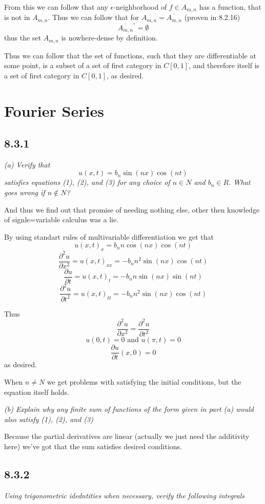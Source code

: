 \documentclass[11pt,oneside,titlepage]{book}
\begin{document}
From this we can follow that any $\epsilon$-neighborhood of $f \in A_{m, n}$ has a
function, that is not in $A_{m, n}$. Thus we can follow that for
$A_{m, n} = \overline{A_{m, n}}$ (proven in 8.2.16)
$$\overline{A_{m, n}}^\circ = \emptyset$$
thus the set $A_{m, n}$ is nowhere-dense by definition.

Thus we can follow that
the set of functions, such that they are differentiable at some point, is a subset
of a set of first category in $C[0, 1]$, and therefore itself is a set of
first category in $C[0, 1]$, as desired.

\section{Fourier Series}

\subsection*{8.3.1}
\textit{(a) Verify that}
$$u(x, t) = b_n \sin(nx) \cos(nt)$$
\textit{satisfies equations (1), (2), and (3) for any choice of $n \in N$ and $b_n \in R$.
  What goes wrong if $n \notin N$?}

And thus we find out that promise of needing nothing else, other then knowledge of
signle=variable calculus was a lie.

By using standart rules of multivariable differentiation we get that
$$u(x, t)_x = b_n n \cos (nx) \cos (nt)$$
$$\frac{\partial^2 u}{\partial x^2} = u(x, t)_{x x} = - b_n n^2 \sin (nx) \cos (nt)$$
$$\frac{\partial u}{\partial t} = u(x, t)_t = - b_n n \sin (nx) \sin (nt)$$
$$\frac{\partial^2 u}{\partial t^2} = u(x, t)_{tt} = - b_n n^2 \sin (nx) \cos (nt)$$

Thus
$$\frac{\partial^2 u}{\partial x^2} = \frac{\partial^2 u}{\partial t^2}$$
$$u(0, t) = 0 \text{ and } u(\pi, t) = 0$$
$$\frac{\partial u}{\partial t}(x, 0) = 0$$
as desired.

When $n \neq N$ we get problems with satisfying the initial conditions, but the
equation itself holds.

\textit{(b) Explain why any finite sum of functions of the form given in part (a) would
  also satisfy (1), (2), and (3)}

Because the partial derivatives are linear (actually we just need the additivity here)
we've got that the sum satisfies desired conditions.

\subsection*{8.3.2}
\textit{Using trigonometric idedntities when necessary, verify the following integrals}
\end{document}
